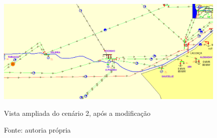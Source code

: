 \begin{figure}[H]
	\centering
	\captionsetup{width=\textwidth, font=footnotesize, textfont=bf}	
	\includegraphics[width=\linewidth]{img/caso_2_depois_expandido.PNG}
	\caption{Vista ampliada do cenário 2, após a modificação}
	\vspace{-3.5mm}
	\caption*{Fonte: autoria própria}
	\label{fig:caso_2_depois_geral}
\end{figure}

